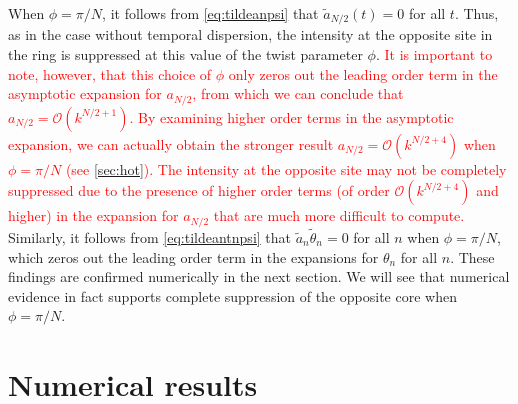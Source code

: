 \documentclass[11pt,reqno]{amsart}
\newcommand{\revised}[1]{ \textcolor{red}{#1} }
\begin{document}
When $\phi = \pi/N$, it follows from \cref{eq:tildeanpsi} that $\widetilde{a}_{N/2}(t) = 0$ for all $t$. Thus, as in the case without temporal dispersion, the intensity at the opposite site in the ring is suppressed at this value of the twist parameter $\phi$. 
\revised{
It is important to note, however, that this choice of $\phi$ only zeros out the leading order term in the asymptotic expansion for $a_{N/2}$, from which we can conclude that $a_{N/2} = \mathcal{O}(k^{N/2+1})$. By examining higher order terms in the asymptotic expansion, we can actually obtain the stronger result $a_{N/2} = \mathcal{O}(k^{N/2+4})$ when $\phi = \pi/N$ (see \cref{sec:hot}). The intensity at the opposite site may not be completely suppressed due to the presence of higher order terms (of order $\mathcal{O}(k^{N/2+4})$ and higher) in the expansion for $a_{N/2}$ that are much more difficult to compute.
}
Similarly, it follows from \cref{eq:tildeantnpsi} that $\widetilde{a}_n \widetilde{\theta}_n = 0$ for all $n$ when $\phi = \pi/N$, which zeros out the leading order term in the expansions for $\theta_n$ for all $n$. These findings are confirmed numerically in the next section. We will see that numerical evidence in fact supports complete suppression of the opposite core when $\phi = \pi/N$.

\section{Numerical results}\label{sec:numerics}
\end{document}

